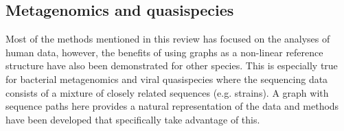 
%

\subsection{Metagenomics and quasispecies}
Most of the methods mentioned in this review has focused on the analyses of human data, however, the benefits of using graphs as a non-linear reference structure have also been demonstrated for other species.
This is especially true for bacterial metagenomics and viral quasispecies where the sequencing data consists of a mixture of closely related sequences (e.g. strains).
A graph with sequence paths here provides a natural representation of the data and methods have been developed that specifically take advantage of this. 

